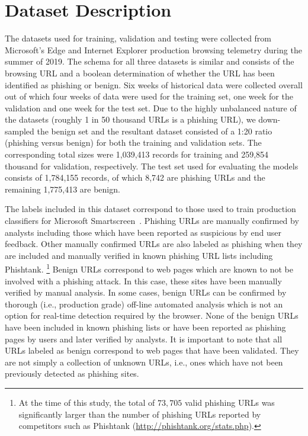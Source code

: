 \section{Dataset Description}
\label{sec:urltran:data}
The datasets used for training, validation and testing were collected from Microsoft’s Edge and Internet Explorer production browsing telemetry during the summer of 2019.
The schema for all three datasets is similar and consists of the browsing URL and a boolean determination of whether the URL has been identified as phishing or benign.
Six weeks of historical data were collected overall out of which four weeks of data were used for the training set, one week for the validation and one week for the test set.
Due to the highly unbalanced nature of the datasets (roughly 1 in 50 thousand URLs is a phishing URL), we down-sampled the benign set and the resultant dataset consisted of a 1:20 ratio (phishing versus benign) for both the training and validation sets. 
The corresponding total sizes were 1,039,413 records for training and 259,854 thousand for validation, respectively.
The test set used for evaluating the models consists of 1,784,155 records, of which 8,742 are phishing URLs and the remaining 1,775,413 are benign. 

The labels included in this dataset correspond to those used to train production classifiers for Microsoft Smartscreen~\citep{smartscreen_microsoft}.
Phishing URLs are manually confirmed by analysts including those which have been reported as suspicious by end user feedback.
Other manually confirmed URLs are also labeled as phishing when they are included and manually verified in known phishing URL lists including Phishtank. \footnote{At the time of this study, the total of $73,705$ valid phishing URLs was significantly larger than the number of phishing URLs reported by competitors such as Phishtank (\url{http://phishtank.org/stats.php}).}
Benign URLs correspond to web pages which are known to not be involved with a phishing attack. In this case, these sites have been manually verified by manual analysis.
In some cases, benign URLs can be confirmed by thorough (i.e., production grade) off-line automated analysis which is not an option for real-time detection required by the browser.
None of the benign URLs have been included in known phishing lists or have been reported as phishing pages by users and later verified by analysts.
It is important to note that all URLs labeled as benign correspond to web pages that have been validated.
They are not simply a collection of unknown URLs, i.e., ones which have not been previously detected as phishing sites. 
